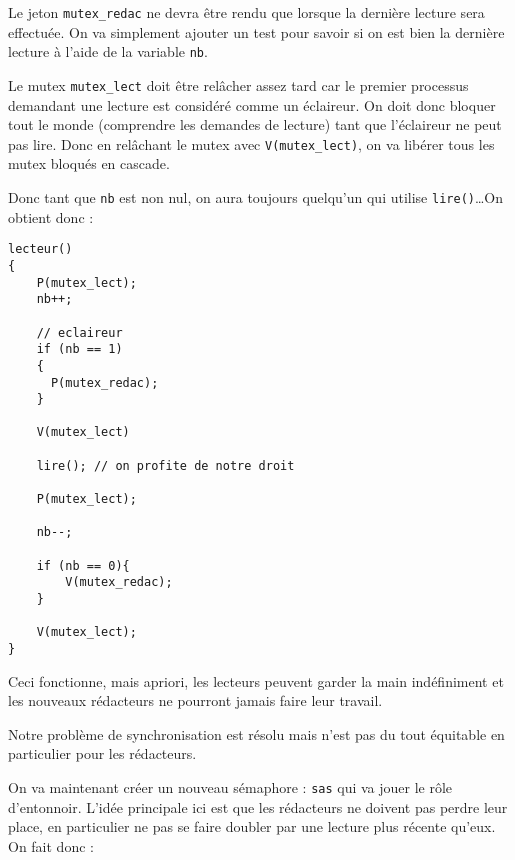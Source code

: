 \documentclass[12pt,a4paper]{report}
\begin{document}
Le jeton \verb?mutex_redac? ne devra être rendu que lorsque la dernière lecture sera effectuée. On va simplement ajouter un test pour savoir si on est bien la dernière lecture à l'aide de la variable \verb?nb?.

\medskip

Le mutex \verb?mutex_lect? doit être relâcher assez tard car le premier processus demandant une lecture est considéré comme un éclaireur. On doit donc bloquer \og tout le monde\fg{} (comprendre les demandes de lecture) tant que l'éclaireur ne peut pas lire. Donc en relâchant le mutex avec \verb?V(mutex_lect)?, on va libérer tous les mutex bloqués en cascade.

Donc tant que \verb?nb? est non nul, on aura toujours quelqu'un qui utilise \verb?lire()?\dots On obtient donc :

\medskip

\begin{center}
  \begin{verbatim}
lecteur()
{
    P(mutex_lect);
    nb++;

    // eclaireur
    if (nb == 1)
    {
      P(mutex_redac);
    }

    V(mutex_lect)

    lire(); // on profite de notre droit

    P(mutex_lect);

    nb--;

    if (nb == 0){
        V(mutex_redac);
    }

    V(mutex_lect);
}
\end{verbatim}
\end{center}

Ceci fonctionne, mais apriori, les lecteurs peuvent garder la main indéfiniment et les nouveaux rédacteurs ne pourront jamais faire leur travail.

Notre problème de synchronisation est résolu mais n'est pas du tout équitable en particulier pour les rédacteurs.

On va maintenant créer un nouveau sémaphore : \verb?sas? qui va jouer le rôle d'entonnoir. L'idée principale ici est que les rédacteurs ne doivent \og pas perdre leur place\fg{}, en particulier ne pas se faire doubler par une lecture plus récente qu'eux. On fait donc :

\medskip
\end{document}
